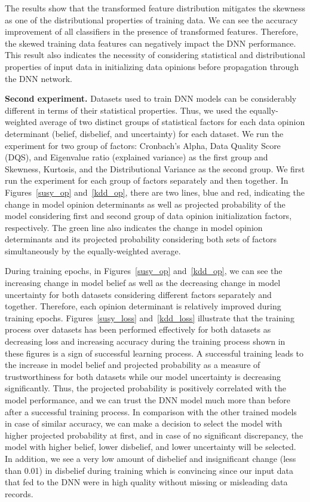 The results show that the transformed feature distribution mitigates the skewness as one of the distributional properties of training data. We can see the accuracy improvement of all classifiers in the presence of transformed features. Therefore, the skewed training data features can negatively impact the DNN performance. This result also indicates the necessity of considering statistical and distributional properties of input data in initializing data opinions before propagation through the DNN network. 

\vspace {.2cm}
\noindent
\textbf{Second experiment.} Datasets used to train DNN models can be considerably different in terms of their statistical properties. Thus, we used the equally-weighted average of two distinct groups of statistical factors for each data opinion determinant (belief, disbelief, and uncertainty) for each dataset. We run the experiment for two group of factors: Cronbach's Alpha, Data Quality Score (DQS), and Eigenvalue ratio (explained variance) as the first group and Skewness, Kurtosis, and the Distributional Variance as the second group. We first run the experiment for each group of factors separately and then together. In Figures~\ref{susy_op} and~\ref{kdd_op}, there are two lines, blue and red, indicating the change in model opinion determinants as well as projected probability of the model considering first and second group of data opinion initialization factors, respectively. The green line also indicates the change in model opinion determinants and its projected probability considering both sets of factors simultaneously by the equally-weighted average. 

During training epochs, in Figures~\ref{susy_op} and~\ref{kdd_op}, we can see the increasing change in model belief as well as the decreasing change in model uncertainty for both datasets considering different factors separately and together. Therefore, each opinion determinant is relatively improved during training epochs.
Figures~\ref{susy_loss} and~\ref{kdd_loss} illustrate that the training process over datasets has been performed effectively for both datasets as decreasing loss and increasing accuracy during the training process shown in these figures is a sign of successful learning process. A successful training leads to the increase in model belief and projected probability as a measure of trustworthiness for both datasets while our model uncertainty is decreasing significantly. Thus, the projected probability is positively correlated with the model performance, and we can trust the DNN model much more than before after a successful training process. In comparison with the other trained models in case of similar accuracy, we can make a decision to select the model with higher projected probability at first, and in case of no significant discrepancy, the model with higher belief, lower disbelief, and lower uncertainty will be selected. In addition, we see a very low amount of disbelief and insignificant change (less than 0.01) in disbelief during training which is convincing since our input data that fed to the DNN were in high quality without missing or misleading data records. 

